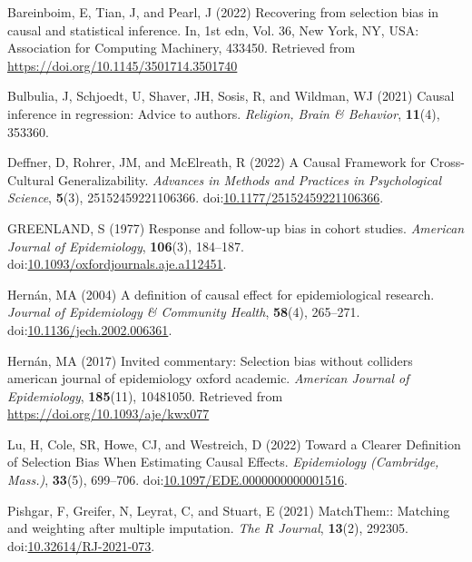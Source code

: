 \documentclass[
  singlecolumn,
  9pt]{article}
\newlength{\cslentryspacing}
\begin{document}
\label{refs}
\setlength{\cslentryspacing}{0em}
\begin{CSLReferences}
Bareinboim, E, Tian, J, and Pearl, J (2022) Recovering from selection
bias in causal and statistical inference. In, 1st edn, Vol. 36, New
York, NY, USA: Association for Computing Machinery, 433450. Retrieved
from \url{https://doi.org/10.1145/3501714.3501740}

Bulbulia, J, Schjoedt, U, Shaver, JH, Sosis, R, and Wildman, WJ (2021)
Causal inference in regression: Advice to authors. \emph{Religion, Brain
\& Behavior}, \textbf{11}(4), 353360.

Deffner, D, Rohrer, JM, and McElreath, R (2022) A Causal Framework for
Cross-Cultural Generalizability. \emph{Advances in Methods and Practices
in Psychological Science}, \textbf{5}(3), 25152459221106366.
doi:\href{https://doi.org/10.1177/25152459221106366}{10.1177/25152459221106366}.

GREENLAND, S (1977) Response and follow-up bias in cohort studies.
\emph{American Journal of Epidemiology}, \textbf{106}(3), 184--187.
doi:\href{https://doi.org/10.1093/oxfordjournals.aje.a112451}{10.1093/oxfordjournals.aje.a112451}.

Hernán, MA (2004) A definition of causal effect for epidemiological
research. \emph{Journal of Epidemiology \& Community Health},
\textbf{58}(4), 265--271.
doi:\href{https://doi.org/10.1136/jech.2002.006361}{10.1136/jech.2002.006361}.

Hernán, MA (2017) Invited commentary: Selection bias without colliders
\textbar{} american journal of epidemiology \textbar{} oxford academic.
\emph{American Journal of Epidemiology}, \textbf{185}(11), 10481050.
Retrieved from \url{https://doi.org/10.1093/aje/kwx077}

Lu, H, Cole, SR, Howe, CJ, and Westreich, D (2022) Toward a Clearer
Definition of Selection Bias When Estimating Causal Effects.
\emph{Epidemiology (Cambridge, Mass.)}, \textbf{33}(5), 699--706.
doi:\href{https://doi.org/10.1097/EDE.0000000000001516}{10.1097/EDE.0000000000001516}.

Pishgar, F, Greifer, N, Leyrat, C, and Stuart, E (2021) MatchThem::
Matching and weighting after multiple imputation. \emph{The R Journal},
\textbf{13}(2), 292305.
doi:\href{https://doi.org/10.32614/RJ-2021-073}{10.32614/RJ-2021-073}.


\end{CSLReferences}
\end{document}
